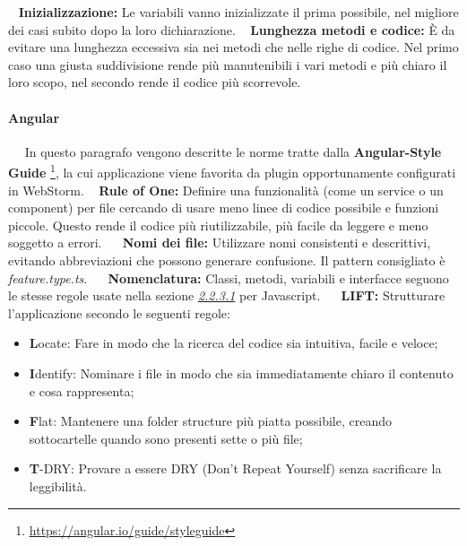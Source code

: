 	~\newline
	\textbf{Inizializzazione:} Le variabili vanno inizializzate il prima possibile, nel migliore dei casi subito dopo la loro dichiarazione. \newline
	~\newline
	\textbf{Lunghezza metodi e codice:} È da evitare una lunghezza eccessiva sia nei metodi che nelle righe di codice. Nel primo caso una giusta suddivisione rende più manutenibili i vari metodi e più chiaro il loro scopo, nel secondo rende il codice più scorrevole. \newline
	
	\paragraph{Angular} ~\newline ~\newline
	In questo paragrafo vengono descritte le norme tratte dalla \textbf{Angular-Style Guide} \footnote{\url{https://angular.io/guide/styleguide}}, la cui applicazione viene favorita da plugin opportunamente configurati in WebStorm\pedice.
	\newline
	~\newline
	\textbf{Rule of One:} Definire una funzionalità (come un service o un component) per file cercando di usare meno linee di codice possibile e funzioni piccole. Questo rende il codice più riutilizzabile, più facile da leggere e meno soggetto a errori.~\newline
	~\newline
	\textbf{Nomi dei file:} Utilizzare nomi consistenti e descrittivi, evitando abbreviazioni che possono generare confusione. Il pattern consigliato è \textit{feature.type.ts}.~\newline
	~\newline
	\textbf{Nomenclatura:} Classi, metodi, variabili e interfacce seguono le stesse regole usate nella sezione \textit{\underline{2.2.3.1}} per Javascript.~\newline
	~\newline
	\textbf{LIFT:} Strutturare l'applicazione secondo le seguenti regole:
	\begin{itemize}
	    \item \textbf{L}ocate: Fare in modo che la ricerca del codice sia intuitiva, facile e veloce;
	    \item \textbf{I}dentify: Nominare i file in modo che sia immediatamente chiaro il contenuto e cosa rappresenta;
	    \item \textbf{F}lat: Mantenere una folder structure più piatta possibile, creando sottocartelle quando sono presenti sette o più file;
	    \item \textbf{T}-DRY: Provare a essere DRY (Don't Repeat Yourself) senza sacrificare la leggibilità.~\newline
	\end{itemize}
